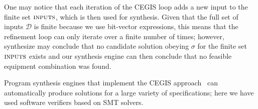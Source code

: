 \documentclass[review]{elsarticle}
\begin{document}
One may notice that each iteration of the CEGIS loop adds a new input to the finite set $\text{\sc inputs}$, which is then used for synthesis.  Given that the full set of inputs $\mathcal{D}$ is finite because we use bit-vector expressions, this means that the refinement loop can only iterate over a finite number of times; however, {\sc synthesize} may conclude that no candidate solution obeying $\sigma$ for the finite set $\text{\sc inputs}$ exists and our synthesis engine can then conclude that no feasible equipment combination was found. %

Program synthesis engines that implement the CEGIS approach~\cite{sketch} can automatically produce solutions for a large variety of specifications; %
here we have used software verifiers based on SMT solvers.%
%
\end{document}
